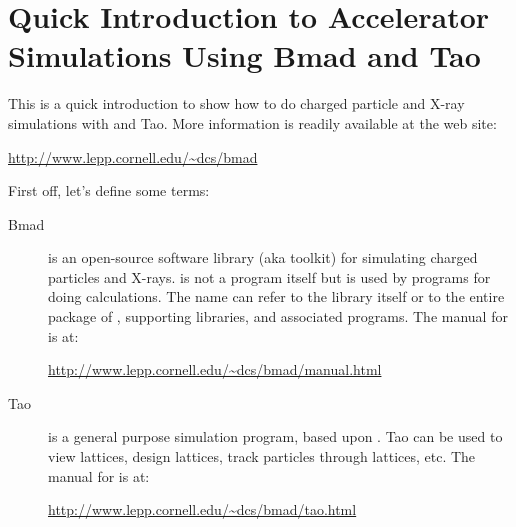 \documentclass{report}
\begin{document}
\setlength{\parskip}{\dPar}
\setlength{\parindent}{0ex}

\let\oldsection\section
\renewcommand{\section}[1]{\oldsection*{#1}}

\let\oldsubsection\subsection
\renewcommand{\subsection}[1]{\oldsubsection*{#1}}

\chapter*{Quick Introduction to Accelerator Simulations Using Bmad and Tao}

This is a quick introduction to show how to do charged particle and X-ray simulations
with \bmad and Tao. More information is readily available at the \bmad web site:
\begin{example}
  \url{http://www.lepp.cornell.edu/~dcs/bmad}
\end{example}

First off, let's define some terms:
  \begin{description}
  \item[Bmad] \Newline
\bmad is an open-source software library (aka toolkit) for simulating charged particles
and X-rays. \bmad is not a program itself but is used by programs for doing
calculations. The name  can refer to the \bmad library itself or to the entire
package of \bmad, supporting libraries, and associated programs. The manual for \bmad is at:
\begin{example}
  \url{http://www.lepp.cornell.edu/~dcs/bmad/manual.html}
\end{example}
  \item[Tao] \Newline
{} is a general purpose simulation program, based upon \bmad. Tao can be used to
view lattices, design lattices, track particles through lattices, etc. The manual for
 is at:
\begin{example}
  \url{http://www.lepp.cornell.edu/~dcs/bmad/tao.html}
\end{example}
  \end{description}
\end{document}
